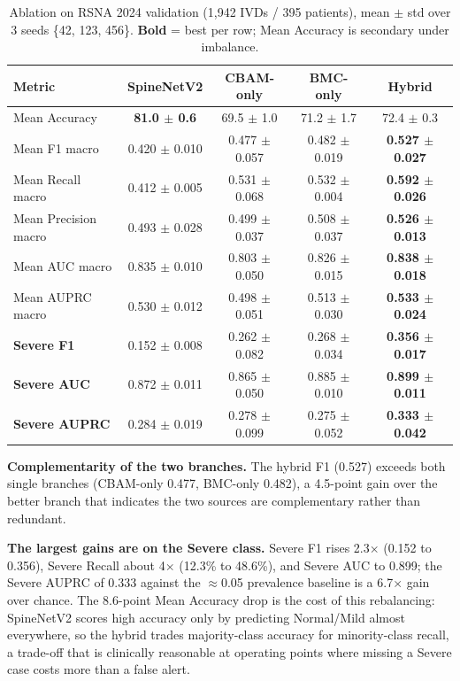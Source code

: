 \documentclass[runningheads]{llncs}
\newcommand{\best}[1]{\textcolor{best}{\textbf{#1}}}
\begin{document}
\begin{table}[t]
\centering
\caption{Ablation on RSNA 2024 validation (1{,}942 IVDs / 395 patients), mean $\pm$ std over 3 seeds \{42, 123, 456\}. \textbf{Bold} = best per row; Mean Accuracy is secondary under imbalance.}
\label{tab:main}
\footnotesize
\setlength{\tabcolsep}{4pt}
\begin{tabular}{@{}lcccc@{}}
\toprule
Metric & SpineNetV2 & CBAM-only & BMC-only & Hybrid \\
\midrule
Mean Accuracy        & \best{81.0 $\pm$ 0.6} & 69.5 $\pm$ 1.0 & 71.2 $\pm$ 1.7 & 72.4 $\pm$ 0.3 \\
Mean F1 macro        & 0.420 $\pm$ 0.010 & 0.477 $\pm$ 0.057 & 0.482 $\pm$ 0.019 & \best{0.527 $\pm$ 0.027} \\
Mean Recall macro    & 0.412 $\pm$ 0.005 & 0.531 $\pm$ 0.068 & 0.532 $\pm$ 0.004 & \best{0.592 $\pm$ 0.026} \\
Mean Precision macro & 0.493 $\pm$ 0.028 & 0.499 $\pm$ 0.037 & 0.508 $\pm$ 0.037 & \best{0.526 $\pm$ 0.013} \\
Mean AUC macro       & 0.835 $\pm$ 0.010 & 0.803 $\pm$ 0.050 & 0.826 $\pm$ 0.015 & \best{0.838 $\pm$ 0.018} \\
Mean AUPRC macro     & 0.530 $\pm$ 0.012 & 0.498 $\pm$ 0.051 & 0.513 $\pm$ 0.030 & \best{0.533 $\pm$ 0.024} \\
\midrule
\textbf{Severe F1}    & 0.152 $\pm$ 0.008 & 0.262 $\pm$ 0.082 & 0.268 $\pm$ 0.034 & \best{0.356 $\pm$ 0.017} \\
\textbf{Severe AUC}   & 0.872 $\pm$ 0.011 & 0.865 $\pm$ 0.050 & 0.885 $\pm$ 0.010 & \best{0.899 $\pm$ 0.011} \\
\textbf{Severe AUPRC} & 0.284 $\pm$ 0.019 & 0.278 $\pm$ 0.099 & 0.275 $\pm$ 0.052 & \best{0.333 $\pm$ 0.042} \\
\bottomrule
\end{tabular}
\end{table}

\textbf{Complementarity of the two branches.} The hybrid F1 (0.527) exceeds both single branches (CBAM-only 0.477, BMC-only 0.482), a 4.5-point gain over the better branch that indicates the two sources are complementary rather than redundant.

\textbf{The largest gains are on the Severe class.} Severe F1 rises 2.3$\times$ (0.152 to 0.356), Severe Recall about 4$\times$ (12.3\% to 48.6\%), and Severe AUC to 0.899; the Severe AUPRC of 0.333 against the $\approx$0.05 prevalence baseline is a 6.7$\times$ gain over chance. The 8.6-point Mean Accuracy drop is the cost of this rebalancing: SpineNetV2 scores high accuracy only by predicting Normal/Mild almost everywhere, so the hybrid trades majority-class accuracy for minority-class recall, a trade-off that is clinically reasonable at operating points where missing a Severe case costs more than a false alert.
\end{document}
